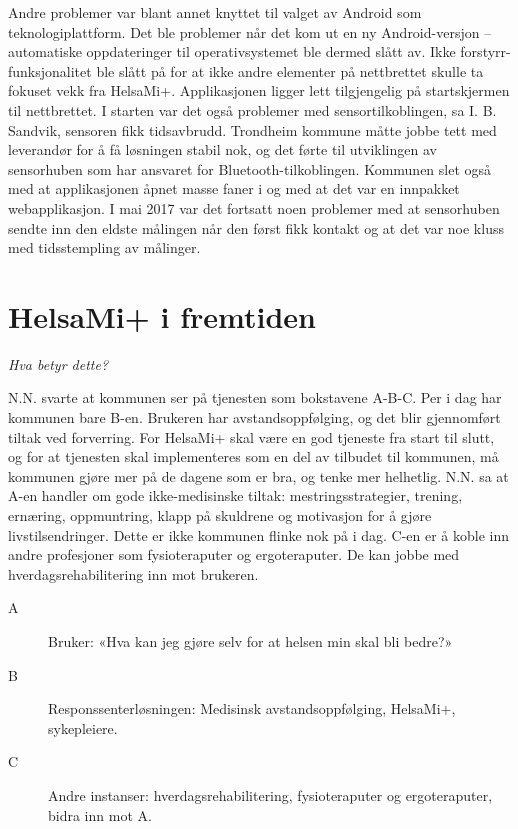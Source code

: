 Andre problemer var blant annet knyttet til valget av Android som teknologiplattform. Det ble problemer når det kom ut en ny Android-versjon --
automatiske oppdateringer til operativsystemet ble dermed slått av. Ikke forstyrr-funksjonalitet ble slått på for at ikke andre elementer
på nettbrettet skulle ta fokuset vekk fra HelsaMi+. Applikasjonen ligger lett tilgjengelig på startskjermen til nettbrettet. I starten var det også
problemer med sensortilkoblingen, sa I. B. Sandvik, sensoren fikk tidsavbrudd. Trondheim kommune måtte jobbe tett med leverandør
for å få løsningen stabil nok, og det førte
til utviklingen av sensorhuben som har ansvaret for Bluetooth-tilkoblingen.
Kommunen slet også med at applikasjonen åpnet masse faner i og med at
det var en innpakket webapplikasjon. I mai 2017 var det fortsatt noen problemer med at sensorhuben
sendte inn den eldste målingen når den først fikk kontakt og at det var noe kluss med tidsstempling av målinger.

\section{HelsaMi+ i fremtiden}
\textit{ Hva betyr dette?}

N.N. svarte at kommunen ser på tjenesten som bokstavene A-B-C. Per i dag har kommunen bare B-en. Brukeren har avstandsoppfølging, og det blir
gjennomført tiltak ved forverring. For HelsaMi+ skal være en god tjeneste fra start til slutt, og for at tjenesten skal
implementeres som en del av tilbudet til kommunen, må kommunen gjøre mer på de dagene som er bra,
og tenke mer helhetlig. N.N. sa at A-en handler om gode ikke-medisinske tiltak: mestringsstrategier, trening, ernæring,
oppmuntring, klapp på skuldrene og motivasjon for å gjøre livstilsendringer. Dette er ikke kommunen flinke nok på i dag. C-en er å koble
inn andre profesjoner som fysioteraputer og ergoteraputer. De kan jobbe med hverdagsrehabilitering inn mot brukeren.

\begin{description}
\item[A] Bruker: «Hva kan jeg gjøre selv for at helsen min skal bli bedre?»
\item[B] Responssenterløsningen: Medisinsk avstandsoppfølging, HelsaMi+, sykepleiere.
\item[C] Andre instanser: hverdagsrehabilitering, fysioteraputer og ergoteraputer, bidra inn mot A.
\end{description}

